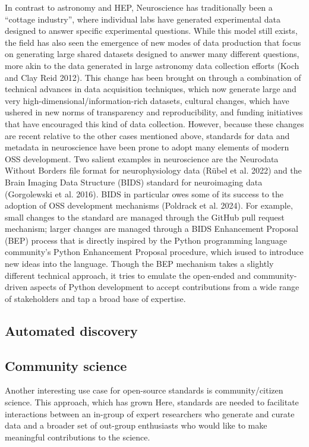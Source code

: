 \documentclass[
  letterpaper,
  DIV=11,
  numbers=noendperiod]{scrartcl}
\begin{document}
In contrast to astronomy and HEP, Neuroscience has traditionally been a
``cottage industry'', where individual labs have generated experimental
data designed to answer specific experimental questions. While this
model still exists, the field has also seen the emergence of new modes
of data production that focus on generating large shared datasets
designed to answer many different questions, more akin to the data
generated in large astronomy data collection efforts (Koch and Clay Reid
2012). This change has been brought on through a combination of
technical advances in data acquisition techniques, which now generate
large and very high-dimensional/information-rich datasets, cultural
changes, which have ushered in new norms of transparency and
reproducibility, and funding initiatives that have encouraged this kind
of data collection. However, because these changes are recent relative
to the other cases mentioned above, standards for data and metadata in
neuroscience have been prone to adopt many elements of modern OSS
development. Two salient examples in neuroscience are the Neurodata
Without Borders file format for neurophysiology data (Rübel et al. 2022)
and the Brain Imaging Data Structure (BIDS) standard for neuroimaging
data (Gorgolewski et al. 2016). BIDS in particular owes some of its
success to the adoption of OSS development mechanisms (Poldrack et al.
2024). For example, small changes to the standard are managed through
the GitHub pull request mechanism; larger changes are managed through a
BIDS Enhancement Proposal (BEP) process that is directly inspired by the
Python programming language community's Python Enhancement Proposal
procedure, which isused to introduce new ideas into the language. Though
the BEP mechanism takes a slightly different technical approach, it
tries to emulate the open-ended and community-driven aspects of Python
development to accept contributions from a wide range of stakeholders
and tap a broad base of expertise.

\subsection{Automated discovery}\label{automated-discovery}

\subsection{Community science}\label{community-science}

Another interesting use case for open-source standards is
community/citizen science. This approach, which has grown Here,
standards are needed to facilitate interactions between an in-group of
expert researchers who generate and curate data and a broader set of
out-group enthusiasts who would like to make meaningful contributions to
the science.
\end{document}
